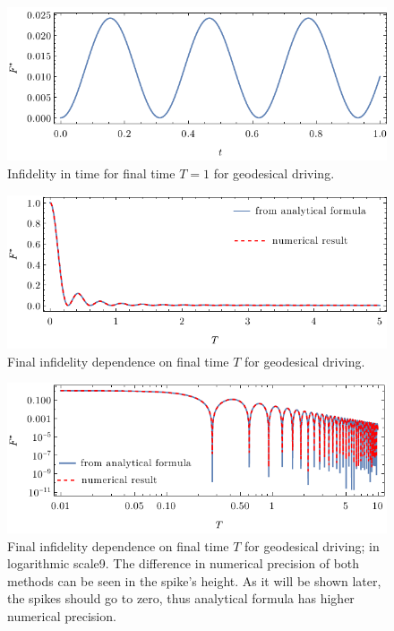 \begin{figure}[h]
    \centering
    \includegraphics[scale=1.2]{../img/infidelityTimePlotGeod.pdf}
    \caption{Infidelity in time for final time $T=1$ for geodesical driving.}
  \label{fig:infidelityTimePlot}
\end{figure}

\vspace{-10pt}\begin{figure}[h]
    \centering
    \includegraphics[scale=1.2]{../img/infidelityTfPlot.pdf}
    \caption{Final infidelity dependence on final time $T$ for geodesical driving.}
    \label{fig:infidelityTfPlot}
\end{figure}

\begin{figure}[h]
    \centering
    \includegraphics[scale=1.2]{../img/infidelityTfPlotLog.pdf}
    \caption{Final infidelity dependence on final time $T$ for geodesical driving; in logarithmic scale9. The difference in numerical precision of both methods can be seen in the spike's height. As it will be shown later, the spikes should go to zero, thus analytical formula has higher numerical precision.}
    \label{fig:infidelityTfPlotLog}
\end{figure}


